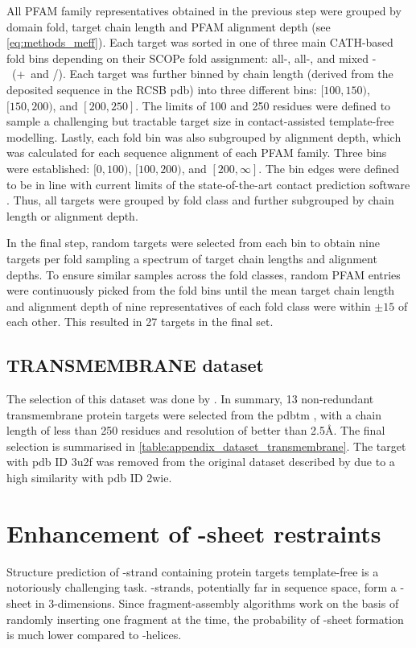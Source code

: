 All PFAM family representatives obtained in the previous step were grouped by domain fold, target chain length and PFAM alignment depth (see \cref{eq:methods_meff}). Each target was sorted in one of three main CATH-based fold bins \cite{Orengo1997-fj} depending on their SCOPe fold assignment: all-\textalpha, all-\textbeta, and mixed \textalpha-\textbeta\ (\textalpha+\textbeta\ and \textalpha/\textbeta). Each target was further binned by chain length (derived from the deposited sequence in the RCSB \gls{pdb}) into three different bins: $[100, 150)$, $[150, 200)$, and $[200, 250]$. The limits of 100 and 250 residues were defined to sample a challenging but tractable target size in contact-assisted template-free modelling. Lastly, each fold bin was also subgrouped by alignment depth, which was calculated for each sequence alignment of each PFAM family. Three bins were established: $[0, 100)$, $[100, 200)$, and $[200, \infty]$. The bin edges were defined to be in line with current limits of the state-of-the-art contact prediction software \cite{Simkovic2017-xs}. Thus, all targets were grouped by fold class and further subgrouped by chain length or alignment depth.

In the final step, random targets were selected from each bin to obtain nine targets per fold sampling a spectrum of target chain lengths and alignment depths. To ensure similar samples across the fold classes, random PFAM entries were continuously picked from the fold bins until the mean target chain length and alignment depth of nine representatives of each fold class were within $\pm15$ of each other. This resulted in 27 targets in the final set.

\subsection{TRANSMEMBRANE dataset} \label{sec:methods_dataset_transmembrane}
The selection of this dataset was done by \textcite{Thomas2017-sh}. In summary, 13 non-redundant transmembrane protein targets were selected from the \gls{pdbtm} \cite{Tusnady2005-ns}, with a chain length of less than 250 residues and resolution of better than 2.5\AA. The final selection is summarised in \cref{table:appendix_dataset_transmembrane}. The target with \gls{pdb} ID 3u2f was removed from the original dataset described by \textcite{Thomas2017-sh} due to a high similarity with \gls{pdb} ID 2wie.

\section{Enhancement of \textbeta-sheet restraints} \label{sec:methods_bbcontacts_addition}
Structure prediction of \textbeta-strand containing protein targets template-free is a notoriously challenging task. \textbeta-strands, potentially far in sequence space, form a \textbeta-sheet in 3-dimensions. Since fragment-assembly algorithms work on the basis of randomly inserting one fragment at the time, the probability of \textbeta-sheet formation is much lower compared to \textalpha-helices. 

